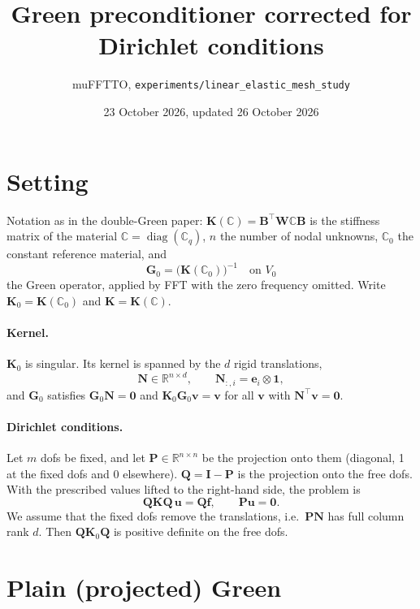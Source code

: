 \documentclass[11pt,a4paper]{article}
\title{Green preconditioner corrected for Dirichlet conditions}
\author{muFFTTO, \texttt{experiments/linear\_elastic\_mesh\_study}}
\date{23 October 2026, updated 26 October 2026}
\begin{document}
\maketitle

\section*{Setting}

Notation as in the double-Green paper: $\mathbf{K}(\mathbb{C}) = \mathbf{B}^{\top}\mathbf{W}\mathbb{C}\mathbf{B}$ is the
stiffness matrix of the material $\mathbb{C} = \operatorname{diag}(\mathbb{C}_q)$, $n$ the number of nodal unknowns,
$\mathbb{C}_0$ the constant reference material, and
\[
  \mathbf{G}_0 = \bigl(\mathbf{K}(\mathbb{C}_0)\bigr)^{-1} \quad \text{on } V_0
\]
the Green operator, applied by FFT with the zero frequency omitted. Write $\mathbf{K}_0 = \mathbf{K}(\mathbb{C}_0)$ and
$\mathbf{K} = \mathbf{K}(\mathbb{C})$.

\paragraph{Kernel.} $\mathbf{K}_0$ is singular. Its kernel is spanned by the $d$ rigid translations,
\[
  \mathbf{N} \in \mathbb{R}^{n\times d}, \qquad \mathbf{N}_{:,i} = \mathbf{e}_i \otimes \mathbf{1},
\]
and $\mathbf{G}_0$ satisfies $\mathbf{G}_0\mathbf{N} = \mathbf{0}$ and $\mathbf{K}_0\mathbf{G}_0\mathbf{v} = \mathbf{v}$ for
all $\mathbf{v}$ with $\mathbf{N}^{\top}\mathbf{v} = \mathbf{0}$.

\paragraph{Dirichlet conditions.} Let $m$ dofs be fixed, and let $\mathbf{P} \in \mathbb{R}^{n\times n}$ be the projection onto
them (diagonal, 1 at the fixed dofs and 0 elsewhere). $\mathbf{Q} = \mathbf{I} - \mathbf{P}$ is the projection onto the free
dofs. With the prescribed values lifted to the right-hand side, the problem is
\[
  \mathbf{Q}\mathbf{K}\mathbf{Q}\,\mathbf{u} = \mathbf{Q}\mathbf{f}, \qquad \mathbf{P}\mathbf{u} = \mathbf{0}.
\]
We assume that the fixed dofs remove the translations, i.e.\ $\mathbf{P}\mathbf{N}$ has full column rank $d$. Then
$\mathbf{Q}\mathbf{K}_0\mathbf{Q}$ is positive definite on the free dofs.

\section*{Plain (projected) Green}
\end{document}
